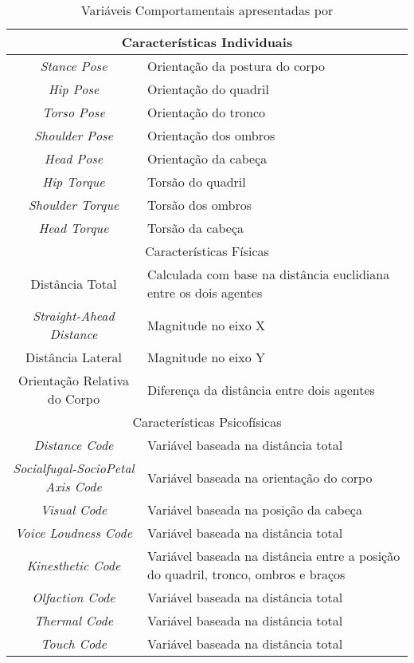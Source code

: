 \begin{table}[!ht]
	\caption{Variáveis Comportamentais apresentadas por }
	\label{tab:variaveiscomportamentaismead}
	\centering
	\begin{tabular}{c | p{8 cm}}
		\hline
		\multicolumn{2}{c}{Características Individuais} \\
		\hline
		\emph{Stance Pose} & Orientação da postura do corpo \\
		\hline
		\emph{Hip Pose} & Orientação do quadril \\
		\hline
		\emph{Torso Pose} & Orientação do tronco \\
		\hline
		\emph{Shoulder Pose} & Orientação dos ombros \\
		\hline
		\emph{Head Pose} & Orientação da cabeça \\
		\hline
		\emph{Hip Torque} & Torsão do quadril \\
		\hline
		\emph{Shoulder Torque} & Torsão dos ombros \\
		\hline
		\emph{Head Torque} & Torsão da cabeça \\
		\hline
		\multicolumn{2}{c}{Características Físicas} \\
		\hline
		Distância Total & Calculada com base na distância euclidiana entre os dois agentes \\
		\hline
		\emph{Straight-Ahead Distance} & Magnitude no eixo X \\
		\hline
		Distância Lateral & Magnitude no eixo Y \\
		\hline
		Orientação Relativa do Corpo & Diferença da distância entre dois agentes \\
		\hline
		\multicolumn{2}{c}{Características Psicofísicas} \\
		\hline
		\emph{Distance Code} & Variável baseada na distância total \\
		\hline
		\emph{Socialfugal-SocioPetal Axis Code} & Variável baseada na orientação do corpo \\
		\hline
		\emph{Visual Code} & Variável baseada na posição da cabeça \\
		\hline
		\emph{Voice Loudness Code} & Variável baseada na distância total \\
		\hline
		\emph{Kinesthetic Code} & Variável baseada na distância entre a posição do quadril, tronco, ombros e braços \\
		\hline
		\emph{Olfaction Code} & Variável baseada na distância total \\
		\hline
		\emph{Thermal Code} & Variável baseada na distância total\\
		\hline
		\emph{Touch Code} & Variável baseada na distância total\\
		\hline
	\end{tabular}
\end{table}

